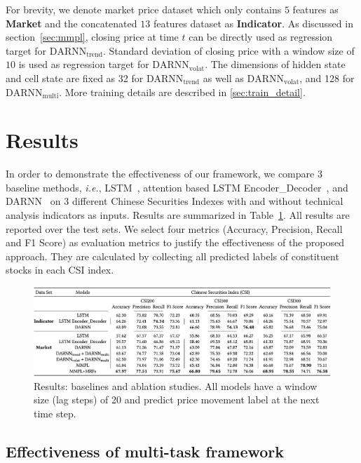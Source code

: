 For brevity, we denote market price dataset which only contains
$5$ features as \textbf{Market} and the concatenated $13$
features dataset as \textbf{Indicator}. As discussed in
section~\ref{sec:mmpl}, closing price at time $t$ can be directly
used as regression target for $\text{DARNN}_{\text{trend}}$.
Standard deviation of closing price with a window size of $10$ is
used as regression target for $\text{DARNN}_{\text{volat}}$. The
dimensions of hidden state and cell state are fixed as 32 for
$\text{DARNN}_{\text{trend}}$ as well as
$\text{DARNN}_{\text{volat}}$, and 128 for
$\text{DARNN}_{\text{multi}}$. More training details are
described in \ref{sec:train_detail}.

\section{Results}
\label{sec:res}

In order to demonstrate the effectiveness of our framework, we
compare 3 baseline methods, \textit{i.e.},
LSTM~\cite{hochreiter1997long}, attention based LSTM
Encoder\_Decoder~\cite{attention}, and DARNN~\cite{qin2017dual}
on 3 different Chinese Securities Indexes with and without
technical analysis indicators as inputs. Results are summarized
in Table~\ref{tab:result}. All results are reported over the test
sets. We select four metrics (Accuracy, Precision, Recall and F1
Score) as evaluation metrics to justify the effectiveness of the
proposed approach. They are calculated by collecting all
predicted labels of constituent stocks in each CSI index.

\begin{figure}[t]
  \centering
  \includegraphics[width=1\columnwidth]{Part2/figures/table_results.png}
  \caption{\label{tab:result} Results: baselines and ablation
    studies. All models have a window size (lag steps) of 20 and
    predict price movement label at the next time step.}
\end{figure}


\subsection{Effectiveness of multi-task framework}

